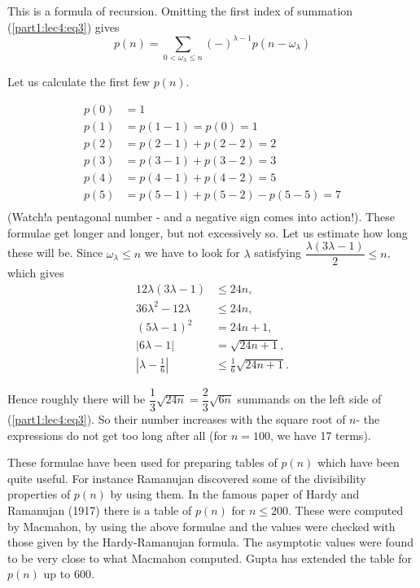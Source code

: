 This is a formula of recursion. Omitting the first index of summation
(\ref{part1:lec4:eq3}) gives
\begin{equation*}
  p(n) = \sum_{0 < \omega_\lambda \leq n} (-)^{\lambda-1}
  p(n-\omega_\lambda) \tag{4}\label{part1:lec4:eq4}
\end{equation*}

Let us calculate the first few $p(n)$.

\begin{align*}
  p(0) & = 1\\
  p(1) & = p(1-1)= p(0)=1\\
  p(2) & = p(2-1) + p(2-2)=2\\
  p(3) & = p(3-1)+ p(3-2)=3\\
  p(4) & = p(4-1)+ p(4-2)=5\\
  p(5) & = p(5-1)+ p(5-2)-p(5-5)=7\\
\end{align*}
(Watch!\pageoriginale  a pentagonal number - and a negative sign comes into
action!). These formulae get longer and longer, but not excessively
so. Let us estimate how long these will be. Since $\omega_\lambda \leq
n$ we have to look for $\lambda$ satisfying $\dfrac{\lambda(3 \lambda
  -1)}{2} \leq n$, which gives
\begin{align*}
  12 \lambda (3 \lambda -1) & \leq 24 n,\\
  36 \lambda^2 -12\lambda  & \leq 24 n,\\  
  (5 \lambda -1)^2 & = 24 n+1,\\
  |6 \lambda -1 | & = \sqrt{24n+1},\\
  |\lambda - \frac{1}{6}| & \leq \frac{1}{6} \sqrt{24n+1}.
\end{align*}

Hence roughly there will be $\dfrac{1}{3} \sqrt{24n} =
\dfrac{2}{3}\sqrt{6n}$ summands on the left side of (\ref{part1:lec4:eq3}). So their
number increases with the square root of $n$- the expressions do not
get too long after all (for $n=100$, we have 17 terms).

These formulae have been used for preparing tables of $p(n)$ which
have been quite useful. For instance Ramanujan discovered some of the
divisibility properties of $p(n)$ by using them. In the famous paper\pageoriginale 
of Hardy and Ramanujan (1917) there is a table of $p(n)$ for $n \leq
200$. These were computed by Macmahon, by using the above formulae and
the values were checked with those given by the Hardy-Ramanujan
formula. The asymptotic values were found to be very close to what
Macmahon computed. Gupta has extended the table for $p(n)$ up to 600. 


